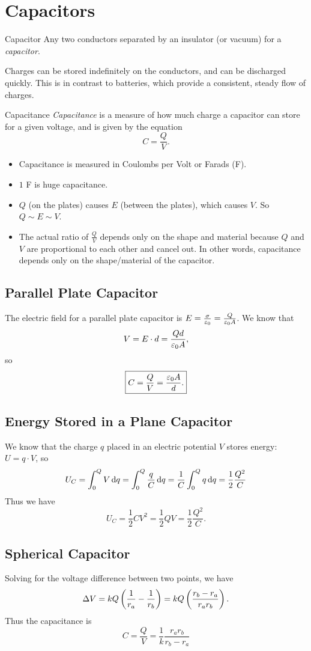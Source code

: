 \documentclass[class=article, crop=false]{standalone}
\begin{document}
  \section{Capacitors}
  \begin{definition}{Capacitor}
    Any two conductors separated by an insulator (or vacuum) for a \emph{capacitor}.
  \end{definition}
  Charges can be stored indefinitely on the conductors, and can be discharged quickly. This is in contrast to batteries, which provide a consistent, steady flow of charges.
  \begin{definition}{Capacitance}
    \emph{Capacitance} is a measure of how much charge a capacitor can store for a given voltage, and is given by the equation
    \[
      C = \frac{Q}{V}.
    \]
    \begin{itemize}
      \item Capacitance is measured in Coulombs per Volt or Farads (F).
      \item $1$ F is huge capacitance.
      \item $Q$ (on the plates) causes $E$ (between the plates), which causes $V$. So $Q\sim E\sim V$.
      \item The actual ratio of $\frac{Q}{V}$ depends only on the shape and material because $Q$ and $V$ are proportional to each other and cancel out. In other words, capacitance depends only on the shape/material of the capacitor.
    \end{itemize}
  \end{definition}
  \subsection{Parallel Plate Capacitor}
  The electric field for a parallel plate capacitor is $E = \frac{\sigma}{\varepsilon_0} = \frac{Q}{\varepsilon_0A}$. We know that
  \[
    V = E\cdot d = \frac{Qd}{\varepsilon_0A},
  \]
  so 
  \[
    \boxed{C = \frac{Q}{V} = \frac{\varepsilon_0A}{d}.}
  \]
  \subsection{Energy Stored in a Plane Capacitor}
  We know that the charge $q$ placed in an electric potential $V$ stores energy: $U = q\cdot V$, so
  \[
    U_C = \int_{0}^{Q}V \,\mathrm{d}q = \int_{0}^{Q}\frac{q}{C} \,\mathrm{d}q = \frac{1}{C}\int_{0}^{Q}q \,\mathrm{d}q = \frac{1}{2}\frac{Q^2}{C}
  \]
  Thus we have
  \[
    \boxed{U_C = \frac{1}{2}CV^2 = \frac{1}{2}QV = \frac{1}{2}\frac{Q^2}{C}.}
  \]
  \subsection{Spherical Capacitor}
  Solving for the voltage difference between two points, we have
  \[
    \Delta V = kQ \left( \frac{1}{r_a} - \frac{1}{r_b} \right) = kQ \left( \frac{r_b - r_a}{r_ar_b} \right).
  \]
  Thus the capacitance is
  \[
    C = \frac{Q}{V} = \frac{1}{k}\frac{r_ar_b}{r_b-r_a}
  \]
\end{document}
